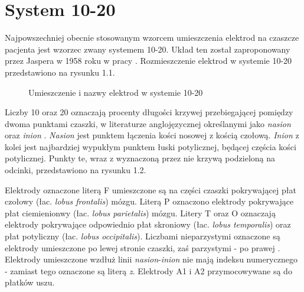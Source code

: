 \documentclass[notitlepage]{report}
\begin{document}
\section{System 10-20}
Najpowszechniej obecnie stosowanym wzorcem umieszczenia elektrod na czaszcze pacjenta jest wzorzec zwany systemem 10-20. Układ ten został zaproponowany przez Jaspera w 1958 roku w pracy \cite{jasper}. Rozmieszczenie elektrod w systemie 10-20 przedstawiono na rysunku 1.1.

\begin{figure}[H]
	\centering
	\caption{Umieszczenie i nazwy elektrod w systemie 10-20 \cite{1020system}}
\end{figure}
Liczby 10 oraz 20 oznaczają procenty długości krzywej przebiegającej pomiędzy dwoma punktami czaszki, w literaturze anglojęzycznej określanymi jako \textit{nasion} oraz \textit{inion} \cite{jasper}. \textit{Nasion} jest punktem łączenia kości nosowej z kością czołową. \textit{Inion} z kolei jest najbardziej wypukłym punktem łuski potylicznej, będącej częścia kości potylicznej. 
Punkty te, wraz z wyznaczoną przez nie krzywą podzieloną na odcinki, przedstawiono na rysunku 1.2.

Elektrody oznaczone literą F umieszczone są na części czaszki pokrywającej płat czołowy (łac. \textit{lobus frontalis}) mózgu. Literą P oznaczono elektrody pokrywające płat ciemienionwy (łac. \textit{lobus parietalis}) mózgu. Litery T oraz O oznaczają elektrody pokrywające odpowiednio płat skroniowy (łac. \textit{lobus temporalis}) oraz płat potyliczny (łac. \textit{lobus occipitalis}). Liczbami nieparzystymi oznaczone są elektrody umieszczone po lewej stronie czaszki, zaś parzystymi - po prawej \cite{jasper} \cite{teplan}. Elektrody umieszczone wzdłuż linii \textit{nasion}-\textit{inion} nie mają indeksu numerycznego - zamiast tego oznaczone są literą \textit{z}. Elektrody A1 i A2 przymocowywane są do płatków uszu.
\end{document}
